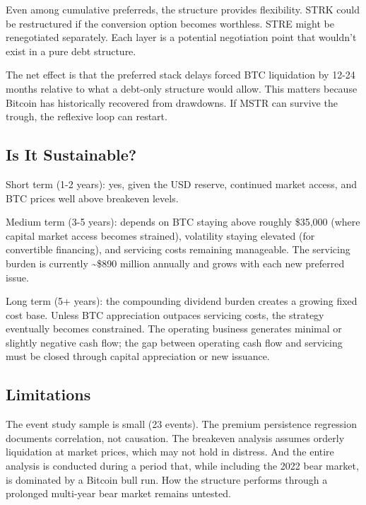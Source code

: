 Even among cumulative preferreds, the structure provides flexibility. STRK could be restructured if the conversion option becomes worthless. STRE might be renegotiated separately. Each layer is a potential negotiation point that wouldn't exist in a pure debt structure.

The net effect is that the preferred stack delays forced BTC liquidation by 12-24 months relative to what a debt-only structure would allow. This matters because Bitcoin has historically recovered from drawdowns. If MSTR can survive the trough, the reflexive loop can restart.

\subsection{Is It Sustainable?}

Short term (1-2 years): yes, given the USD reserve, continued market access, and BTC prices well above breakeven levels.

Medium term (3-5 years): depends on BTC staying above roughly \$35,000 (where capital market access becomes strained), volatility staying elevated (for convertible financing), and servicing costs remaining manageable. The servicing burden is currently \textasciitilde\$890 million annually and grows with each new preferred issue.

Long term (5+ years): the compounding dividend burden creates a growing fixed cost base. Unless BTC appreciation outpaces servicing costs, the strategy eventually becomes constrained. The operating business generates minimal or slightly negative cash flow; the gap between operating cash flow and servicing must be closed through capital appreciation or new issuance.

\subsection{Limitations}

The event study sample is small (23 events). The premium persistence regression documents correlation, not causation. The breakeven analysis assumes orderly liquidation at market prices, which may not hold in distress. And the entire analysis is conducted during a period that, while including the 2022 bear market, is dominated by a Bitcoin bull run. How the structure performs through a prolonged multi-year bear market remains untested.


